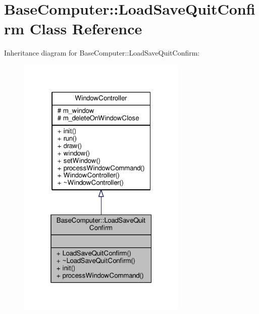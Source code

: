 \hypertarget{classBaseComputer_1_1LoadSaveQuitConfirm}{}\section{Base\+Computer\+:\+:Load\+Save\+Quit\+Confirm Class Reference}
\label{classBaseComputer_1_1LoadSaveQuitConfirm}


Inheritance diagram for Base\+Computer\+:\+:Load\+Save\+Quit\+Confirm\+:
\nopagebreak
\begin{figure}[H]
\begin{center}
\leavevmode
\includegraphics[width=229pt]{d9/d5b/classBaseComputer_1_1LoadSaveQuitConfirm__inherit__graph}
\end{center}
\end{figure}


